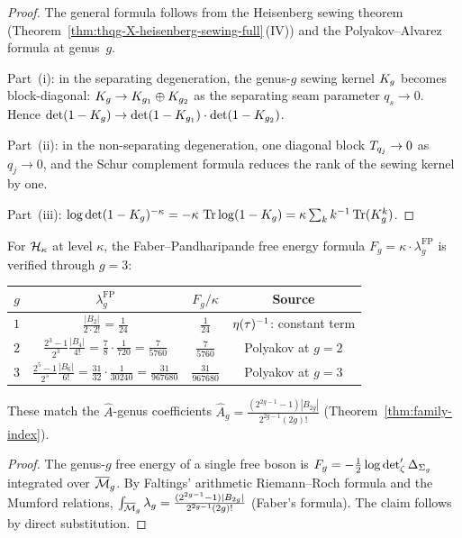 \begin{proof}
The general formula follows from the Heisenberg sewing theorem
(Theorem~\ref{thm:thqg-X-heisenberg-sewing-full}\,(IV)) and
the Polyakov--Alvarez formula at genus~$g$.

Part~(i): in the separating degeneration, the genus-$g$
sewing kernel $K_g$ becomes block-diagonal:
$K_g \to K_{g_1} \oplus K_{g_2}$
as the separating seam parameter $q_s \to 0$.
Hence $\det(1 - K_g) \to
\det(1 - K_{g_1}) \cdot \det(1 - K_{g_2})$.

Part~(ii): in the non-separating degeneration, one diagonal
block $T_{q_j} \to 0$ as $q_j \to 0$, and the Schur
complement formula reduces the rank of the sewing kernel by one.

Part~(iii): $\log\det(1-K_g)^{-\kappa}
= -\kappa\,\operatorname{Tr}\log(1-K_g)
= \kappa\sum_{k} k^{-1}\operatorname{Tr}(K_g^k)$.
\end{proof}

\begin{proposition}%
\label{prop:thqg-X-free-energy-ahat}%
%
For $\mathcal{H}_\kappa$ at level $\kappa$, the Faber--Pandharipande
free energy formula
$F_g = \kappa \cdot \lambda_g^{\mathrm{FP}}$ is verified
through $g = 3$:
\begin{center}
\begin{tabular}{c|c|c|c}
$g$ & $\lambda_g^{\mathrm{FP}}$ & $F_g/\kappa$ & Source \\
\hline
$1$ & $\frac{|B_2|}{2 \cdot 2!} = \frac{1}{24}$ & $\frac{1}{24}$
& $\eta(\tau)^{-1}$: constant term \\[4pt]
$2$ & $\frac{2^3-1}{2^3}\frac{|B_4|}{4!}
= \frac{7}{8}\cdot\frac{1}{720}
= \frac{7}{5760}$ & $\frac{7}{5760}$
& Polyakov at $g = 2$ \\[4pt]
$3$ & $\frac{2^5-1}{2^5}\frac{|B_6|}{6!}
= \frac{31}{32}\cdot\frac{1}{30240}
= \frac{31}{967680}$ & $\frac{31}{967680}$
& Polyakov at $g = 3$
\end{tabular}
\end{center}
These match the $\hat{A}$-genus coefficients
$\hat{A}_g = \frac{(2^{2g-1}-1)|B_{2g}|}{2^{2g-1}(2g)!}$
(Theorem~\textup{\ref{thm:family-index}}).
\end{proposition}

\begin{proof}
The genus-$g$ free energy of a single free boson is
$F_g = -\frac{1}{2}\log\det\nolimits'_\zeta\Delta_{\Sigma_g}$
integrated over $\overline{\mathcal{M}}_g$. By Faltings'
arithmetic Riemann--Roch formula and the Mumford relations,
$\int_{\overline{\mathcal{M}}_g} \lambda_g
= \frac{(2^{2g-1}-1)|B_{2g}|}{2^{2g-1}(2g)!}$
(Faber's formula). The claim follows by direct substitution.
\end{proof}


